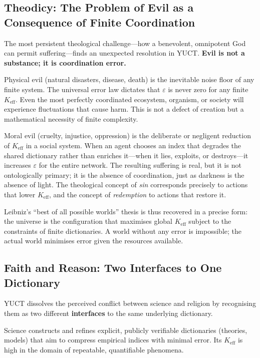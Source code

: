 \documentclass[12pt,a4paper]{article}
\begin{document}
	\subsection{Theodicy: The Problem of Evil as a Consequence of Finite Coordination}
	
	The most persistent theological challenge—how a benevolent, omnipotent God can permit suffering—finds an unexpected resolution in YUCT. \textbf{Evil is not a substance; it is coordination error.}
	
	Physical evil (natural disasters, disease, death) is the inevitable noise floor of any finite system. The universal error law dictates that \(\varepsilon\) is never zero for any finite \(K_{\mathrm{eff}}\). Even the most perfectly coordinated ecosystem, organism, or society will experience fluctuations that cause harm. This is not a defect of creation but a mathematical necessity of finite complexity.
	
	Moral evil (cruelty, injustice, oppression) is the deliberate or negligent reduction of \(K_{\mathrm{eff}}\) in a social system. When an agent chooses an index that degrades the shared dictionary rather than enriches it—when it lies, exploits, or destroys—it increases \(\varepsilon\) for the entire network. The resulting suffering is real, but it is not ontologically primary; it is the absence of coordination, just as darkness is the absence of light. The theological concept of \emph{sin} corresponds precisely to actions that lower \(K_{\mathrm{eff}}\), and the concept of \emph{redemption} to actions that restore it.
	
	Leibniz’s “best of all possible worlds” thesis is thus recovered in a precise form: the universe is the configuration that maximises global \(K_{\mathrm{eff}}\) subject to the constraints of finite dictionaries. A world without any error is impossible; the actual world minimises error given the resources available.
	
	\subsection{Faith and Reason: Two Interfaces to One Dictionary}
	
	YUCT dissolves the perceived conflict between science and religion by recognising them as two different \textbf{interfaces} to the same underlying dictionary.
	
	Science constructs and refines explicit, publicly verifiable dictionaries (theories, models) that aim to compress empirical indices with minimal error. Its \(K_{\mathrm{eff}}\) is high in the domain of repeatable, quantifiable phenomena.
	
\end{document}
